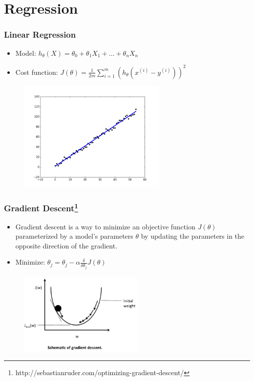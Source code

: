 \documentclass{beamer}
\begin{document}
\section{Regression}
\begin{frame}
	\frametitle{Linear Regression}
	\begin{itemize}
		\item Model: $h_{\theta}(X) = \theta_0 + \theta_{1}X_{1} + ... + \theta_{n}X_{n}$
		\item Cost function: $J(\theta) = \frac{1}{2m}\sum_{i=1}^{m}(h_{\theta}(x^{(i)}-y^{(i)}))^{2}$
	\end{itemize}
	\begin{figure}
		\centering
		\includegraphics[keepaspectratio, width=0.65\textwidth]{graphics/linearRegression}
	\end{figure}
\end{frame}

\begin{frame}
	\frametitle{Gradient Descent\footnote[frame]{http://sebastianruder.com/optimizing-gradient-descent/}}
	\begin{itemize}
		\item Gradient descent is a way to minimize an objective function $J(\theta)$ parameterized by a model's parameters $\theta$ by updating the parameters in the opposite direction of the gradient. 
		\item Minimize: $\theta_{j} = \theta_{j} - \alpha \frac{\delta}{\delta \theta_{j}} J(\theta)$
	\end{itemize}
	\begin{figure}
		\centering
		\includegraphics[keepaspectratio, width=0.55\textwidth]{graphics/gd}
	\end{figure}
\end{frame}
\end{document}

